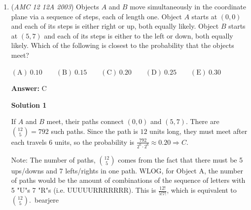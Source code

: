 \begin{enumerate}
 \textbf{Answer: }D



\textbf{Solution 1}

Let the roots be $r_1=0, r_2, r_3, r_4, r_5$. According to \href{https://artofproblemsolving.com/wiki/index.php?title=Vieta\%27s\_formulas}{ Viète's formulae}, we have $d=r_1r_2r_3r_4 + r_1r_2r_3r_5 + r_1r_2r_4r_5 + r_1r_3r_4r_5 + r_2r_3r_4r_5$. The first four terms contain $r_1=0$ and are therefore zero, thus $d=r_2r_3r_4r_5$. This is a product of four non-zero numbers, therefore $d$ must be non-zero $\Longrightarrow \mathrm{(D)}$.

 



\textbf{Solution 2}

Clearly, since $(0,0)$ is an intercept, $e$ must be $0$. But if $d$ was $0$, $x^2$ would divide the polynomial, which means it would have a double root at $0$, which is impossible, since all five roots are distinct.

 


	\item (\textit{AMC 12 12A 2003}) Objects $A$ and $B$ move simultaneously in the coordinate plane via a sequence of steps, each of length one. Object $A$ starts at $(0,0)$ and each of its steps is either right or up, both equally likely. Object $B$ starts at $(5,7)$ and each of its steps is either to the left or down, both equally likely. Which of the following is closest to the probability that the objects meet?


 $\mathrm{(A)} \ 0.10 \qquad \mathrm{(B)} \ 0.15 \qquad \mathrm{(C)} \ 0.20 \qquad \mathrm{(D)} \ 0.25 \qquad \mathrm{(E)} \ 0.30 \qquad$

 \textbf{Answer: }C



\textbf{Solution 1}

If $A$ and $B$ meet, their paths connect $(0,0)$ and $(5,7).$ There are $\binom{12}{5}=792$ such paths. Since the path is $12$ units long, they must meet after each travels $6$ units, so the probability is $\frac{792}{2^{6}\cdot 2^{6}} \approx 0.20 \Rightarrow \boxed{C}$.

 Note: The number of paths, $\binom{12}{5}$ comes from the fact that there must be 5 ups/downs and 7 lefts/rights in one path. WLOG, for Object A, the number of paths would be the amount of combinations of the sequence of letters with 5 "U"s 7 "R"s (i.e. UUUUURRRRRRR). This is $\frac{12!}{5!7!}$, which is equivalent to $\binom{12}{5}$.~bearjere


\end{enumerate}
